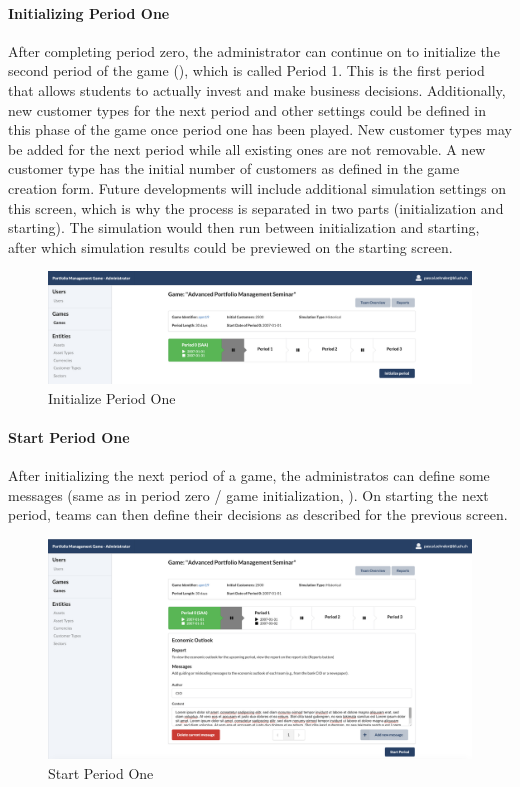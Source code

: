 \paragraph{Initializing Period One}
After completing period zero, the administrator can continue on to initialize the second period of the game (), which is called Period 1. This is the first period that allows students to actually invest and make business decisions. Additionally, new customer types for the next period and other settings could be defined in this phase of the game once period one has been played. New customer types may be added for the next period while all existing ones are not removable. A new customer type has the initial number of customers as defined in the game creation form. Future developments will include additional simulation settings on this screen, which is why the process is separated in two parts (initialization and starting). The simulation would then run between initialization and starting, after which simulation results could be previewed on the starting screen.
\begin{figure}[h!]
  \centering
  \includegraphics[scale=0.2]{img/application-overview/administrator/08_period_initialization.png}
  \caption{Initialize Period One}
  \label{fig:initializing_period}
\end{figure}

\paragraph{Start Period One}
After initializing the next period of a game, the administratos can define some messages (same as in period zero / game initialization, ). On starting the next period, teams can then define their decisions as described for the previous screen.
\begin{figure}[h!]
  \centering
  \includegraphics[scale=0.2]{img/application-overview/administrator/09_period_start.png}
  \caption{Start Period One}
  \label{fig:starting_period_one}
\end{figure}

